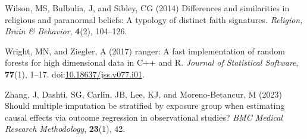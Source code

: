 \documentclass[
  single column]{article}
\newlength{\cslhangindent}
\newenvironment{CSLReferences}[2] %
 {\begin{list}{}{%
  \setlength{\itemindent}{0pt}
  \setlength{\leftmargin}{0pt}
  \setlength{\parsep}{0pt}
  \ifodd #1
   \setlength{\leftmargin}{\cslhangindent}
   \setlength{\itemindent}{-1\cslhangindent}
  \fi
  \setlength{\itemsep}{#2\baselineskip}}}
 {\end{list}}
\begin{document}
\begin{CSLReferences}{1}{0}
Wilson, MS, Bulbulia, J, and Sibley, CG (2014) Differences and
similarities in religious and paranormal beliefs: A typology of distinct
faith signatures. \emph{Religion, Brain \& Behavior}, \textbf{4}(2),
104--126.

Wright, MN, and Ziegler, A (2017) {ranger}: A fast implementation of
random forests for high dimensional data in {C++} and {R}. \emph{Journal
of Statistical Software}, \textbf{77}(1), 1--17.
doi:\href{https://doi.org/10.18637/jss.v077.i01}{10.18637/jss.v077.i01}.

Zhang, J, Dashti, SG, Carlin, JB, Lee, KJ, and Moreno-Betancur, M (2023)
Should multiple imputation be stratified by exposure group when
estimating causal effects via outcome regression in observational
studies? \emph{BMC Medical Research Methodology}, \textbf{23}(1), 42.

\end{CSLReferences}
\end{document}
